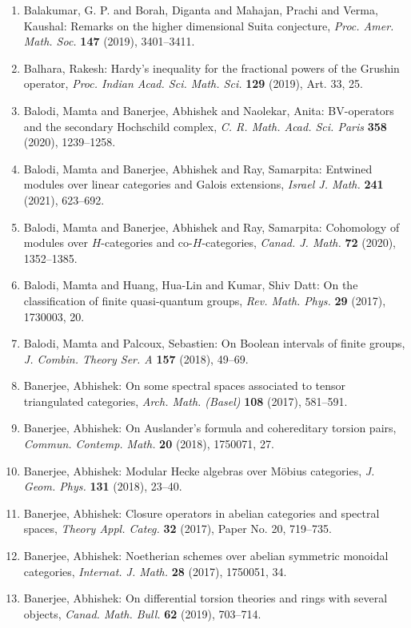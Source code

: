 \begin{enumerate}
\item Balakumar, G. P. and Borah, Diganta and Mahajan, Prachi and
Verma, Kaushal: Remarks on the higher dimensional {S}uita conjecture, \emph{Proc. Amer. Math. Soc.} {\bf 147} (2019), 3401--3411.
\item Balhara, Rakesh: Hardy's inequality for the fractional powers of the {G}rushin
operator, \emph{Proc. Indian Acad. Sci. Math. Sci.} {\bf 129} (2019), Art. 33, 25.
\item Balodi, Mamta and Banerjee, Abhishek and Naolekar, Anita: B{V}-operators and the secondary {H}ochschild complex, \emph{C. R. Math. Acad. Sci. Paris} {\bf 358} (2020), 1239--1258.
\item Balodi, Mamta and Banerjee, Abhishek and Ray, Samarpita: Entwined modules over linear categories and {G}alois
extensions, \emph{Israel J. Math.} {\bf 241} (2021), 623--692.
\item Balodi, Mamta and Banerjee, Abhishek and Ray, Samarpita: Cohomology of modules over {$H$}-categories and
co-{$H$}-categories, \emph{Canad. J. Math.} {\bf 72} (2020), 1352--1385.
\item Balodi, Mamta and Huang, Hua-Lin and Kumar, Shiv Datt: On the classification of finite quasi-quantum groups, \emph{Rev. Math. Phys.} {\bf 29} (2017), 1730003, 20.
\item Balodi, Mamta and Palcoux, Sebastien: On {B}oolean intervals of finite groups, \emph{J. Combin. Theory Ser. A} {\bf 157} (2018), 49--69.
\item Banerjee, Abhishek: On some spectral spaces associated to tensor triangulated
categories, \emph{Arch. Math. (Basel)} {\bf 108} (2017), 581--591.
\item Banerjee, Abhishek: On {A}uslander's formula and cohereditary torsion pairs, \emph{Commun. Contemp. Math.} {\bf 20} (2018), 1750071, 27.
\item Banerjee, Abhishek: Modular {H}ecke algebras over {M}\"{o}bius categories, \emph{J. Geom. Phys.} {\bf 131} (2018), 23--40.
\item Banerjee, Abhishek: Closure operators in abelian categories and spectral spaces, \emph{Theory Appl. Categ.} {\bf 32} (2017), Paper No. 20, 719--735.
\item Banerjee, Abhishek: Noetherian schemes over abelian symmetric monoidal categories, \emph{Internat. J. Math.} {\bf 28} (2017), 1750051, 34.
\item Banerjee, Abhishek: On differential torsion theories and rings with several
objects, \emph{Canad. Math. Bull.} {\bf 62} (2019), 703--714.

\end{enumerate}
